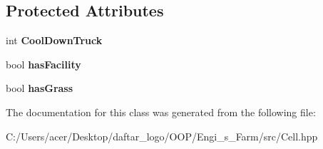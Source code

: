 \subsection*{Protected Attributes}
\begin{DoxyCompactItemize}
\item 
\mbox{\label{class_cell_a28d73a8d3ff2d0f67e35a2896ea62e06}} 
int {\bfseries Cool\+Down\+Truck}
\item 
\mbox{\label{class_cell_ad2e8fc640495c2dd84dc7829fb95e133}} 
bool {\bfseries has\+Facility}
\item 
\mbox{\label{class_cell_acce93f79031e71b72ca8960407830d00}} 
bool {\bfseries has\+Grass}
\end{DoxyCompactItemize}


The documentation for this class was generated from the following file\+:\begin{DoxyCompactItemize}
\item 
C\+:/\+Users/acer/\+Desktop/daftar\+\_\+logo/\+O\+O\+P/\+Engi\+\_\+s\+\_\+\+Farm/src/Cell.\+hpp\end{DoxyCompactItemize}
